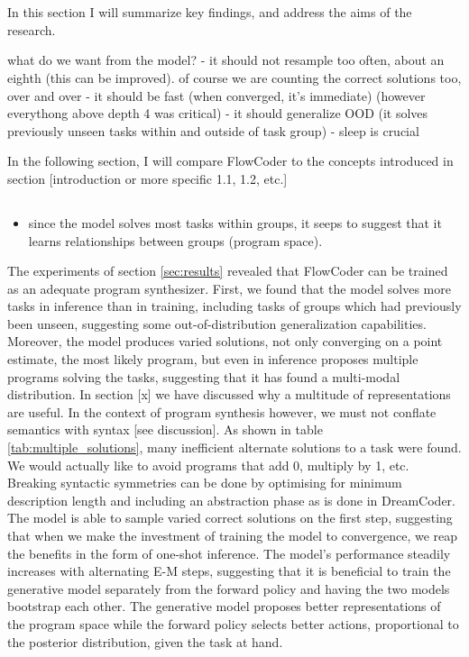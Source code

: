 \section{}
In this section I will summarize key findings, and address the aims of the research.


what do we want from the model?
- it should not resample too often, about an eighth (this can be improved). of course we are counting the correct solutions too, over and over 
- it should be fast (when converged, it's immediate) (however everythong above depth 4 was critical)
- it should generalize OOD (it solves previously unseen tasks within and outside of task group)
- sleep is crucial

In the following section, I will compare FlowCoder to the concepts introduced in section [introduction or more specific 1.1, 1.2, etc.]

\subsection{}

\begin{itemize}
    \item since the model solves most tasks within groups, it seeps to suggest that it learns relationships between groups (program space). 
\end{itemize}

The experiments of section \ref{sec:results} revealed that FlowCoder can be trained as an adequate program synthesizer. 
First, we found that the model solves more tasks in inference than in training, including tasks of groups which had previously been unseen, suggesting some out-of-distribution generalization capabilities.
Moreover, the model produces varied solutions, not only converging on a point estimate, the most likely program, but even in inference proposes multiple programs solving the tasks, suggesting that it has found a multi-modal distribution. 
In section [x] we have discussed why a multitude of representations are useful. In the context of program synthesis however, we must not conflate semantics with syntax [see discussion]. As shown in table \ref{tab:multiple_solutions}, many inefficient alternate solutions to a task were found. We would actually like to avoid programs that add 0, multiply by 1, etc. Breaking syntactic symmetries can be done by optimising for minimum description length and including an abstraction phase as is done in DreamCoder.
The model is able to sample varied correct solutions on the first step, suggesting that when we make the investment of training the model to convergence, we reap the benefits in the form of one-shot inference.
The model's performance steadily increases with alternating E-M steps, suggesting that it is beneficial to train the generative model separately from the forward policy and having the two models bootstrap each other. The generative model proposes better representations of the program space while the forward policy selects better actions, proportional to the posterior distribution, given the task at hand.


